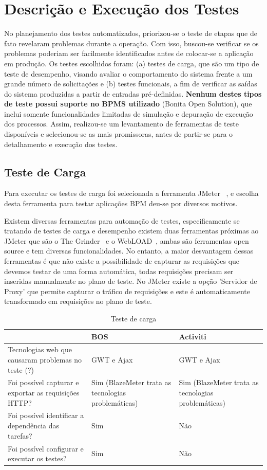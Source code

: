 \documentclass[12pt]{article}
\begin{document}
\section{Descrição e Execução dos Testes}
No planejamento dos testes automatizados, priorizou-se o teste de  etapas que de fato revelaram problemas durante a operação. Com isso, buscou-se verificar se os problemas poderiam ser facilmente identificados antes de colocar-se a aplicação em produção. Os testes escolhidos foram: (a) testes de carga, que são um tipo de teste de desempenho, visando avaliar o comportamento do sistema frente a um grande número de solicitações e (b) testes funcionais, a fim de verificar as saídas do sistema produzidas a partir de entradas pré-definidas. \textbf{Nenhum destes tipos de teste possui suporte no BPMS utilizado} (Bonita Open Solution), que inclui somente funcionalidades limitadas de simulação e depuração de execução dos processos. Assim, realizou-se um levantamento de ferramentas de teste disponíveis e selecionou-se as mais promissoras, antes de partir-se para o detalhamento e execução dos testes.

\subsection{Teste de Carga}
Para executar os testes de carga foi selecionada a ferramenta JMeter ~\cite{JMETER}, e escolha desta ferramenta para testar aplicações BPM deu-se por diversos motivos.

Existem diversas ferramentas para automação de testes, especificamente se tratando de testes de carga e desempenho existem duas ferramentas próximas ao JMeter que são o The Grinder~\cite{GRINDER} e o WebLOAD~\cite{WEBLOAD}, ambas são ferramentas open source e tem diversas funcionalidades. No entanto, a maior desvantagem dessas ferramentas é que não existe a possibilidade de capturar as requisições que devemos testar de uma forma automática, todas requisições precisam ser inseridas manualmente no plano de teste. No JMeter existe a opção 'Servidor de Proxy' que permite capturar o tráfico de requisições e este é automaticamente transformado em requisições no plano de teste.

\begin{table}
{\scriptsize
\begin{tabular}{|p{4cm}|p{4cm}|p{4cm}|}
\hline
 & BOS & Activiti \\\hline
Tecnologias web que causaram problemas no teste (?) & GWT e Ajax & GWT e Ajax\\\hline
Foi possível capturar e exportar as requisições HTTP? & Sim (BlazeMeter trata as tecnologias problemáticas) & Sim (BlazeMeter trata as tecnologias problemáticas)\\\hline
Foi possível identificar a dependência das tarefas? & Sim & Não\\\hline
Foi possível configurar e executar os testes? & Sim & Não\\\hline
\end{tabular}
}
\caption{Teste de carga}
\label{tab:testeCarga}
\end{table}
\end{document}
